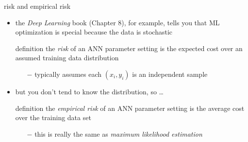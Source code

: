 \documentclass[xcolor={svgnames},
               hyperref={colorlinks,citecolor=DeepPink4,linkcolor=FireBrick,urlcolor=Maroon}]
               {beamer}
\begin{document}
\begin{frame}{risk and empirical risk}

\begin{itemize}
\item the \emph{Deep Learning} book (Chapter 8), for example, tells you that ML optimization is special because the data is stochastic

\begin{block}{definition}
the \emph{risk} of an ANN parameter setting is the expected cost over an assumed  training data distribution
\end{block}

    \begin{itemize}
    \item[$-$] typically assumes each $(x_i,y_i)$ is an independent sample
    \end{itemize}

\item but you don't tend to know the distribution, so \dots

\begin{block}{definition}
the \emph{empirical risk} of an ANN parameter setting is the average cost over the training data set
\end{block}

    \begin{itemize}
    \item[$-$] this is really the same as \emph{maximum likelihood estimation}
    \end{itemize}

\end{itemize}
\end{frame}
\end{document}
